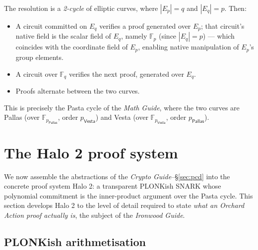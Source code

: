 \documentclass[11pt,a4paper]{article}
\theoremstyle{definition}
\newcommand{\F}{\mathbb{F}}
\newcommand{\Pallas}{\ensuremath{\mathsf{Pallas}}}
\newcommand{\Vesta}{\ensuremath{\mathsf{Vesta}}}
\begin{document}
The resolution is a \emph{2-cycle} of elliptic curves, where $|E_p| = q$ and
$|E_q| = p$. Then:
\begin{itemize}[leftmargin=*]
\item A circuit committed on $E_q$ verifies a proof generated over $E_p$;
that circuit's native field is the scalar field of $E_q$, namely $\F_p$
(since $|E_q| = p$) --- which coincides with the coordinate field of
$E_p$, enabling native manipulation of $E_p$'s group elements.
\item A circuit over $\F_q$ verifies the next proof, generated over $E_q$.
\item Proofs alternate between the two curves.
\end{itemize}
This is precisely the Pasta cycle of the \emph{Math Guide},
where the two curves are Pallas (over $\F_{p_{\Pallas}}$, order $p_{\Vesta}$)
and Vesta (over $\F_{p_{\Vesta}}$, order $p_{\Pallas}$).

\section{The Halo 2 proof system}\label{sec:halo2}

We now assemble the abstractions of the \emph{Crypto Guide}--\S\ref{sec:pcd} into
the concrete proof system Halo 2: a transparent PLONKish SNARK whose
polynomial commitment is the inner-product argument over the Pasta cycle.
This section develops Halo 2 to the level of detail required to state
\emph{what an Orchard Action proof actually is}, the subject of
the \emph{Ironwood Guide}.

\subsection{PLONKish arithmetisation}\label{sec:plonkish}
\end{document}
